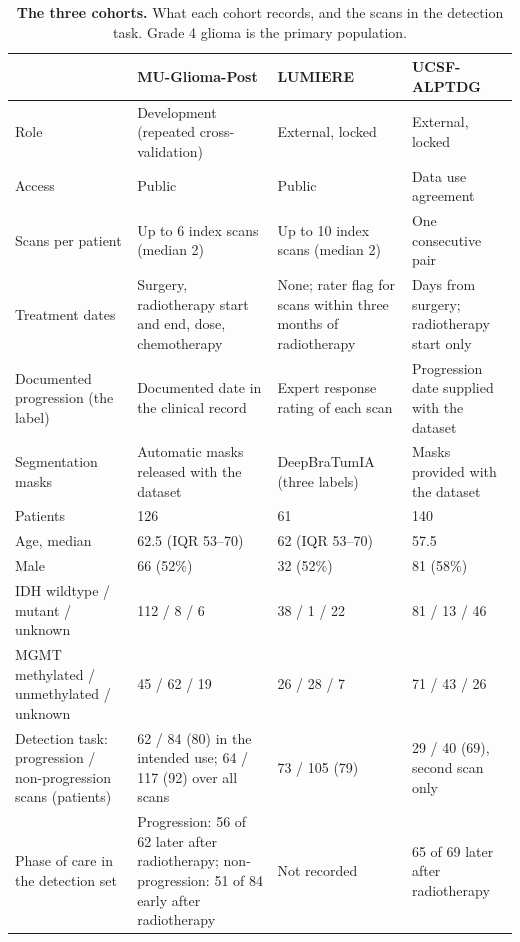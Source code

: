\documentclass[largeformat]{interact} %
\begin{document}
\begin{table}[!htbp]
\centering
\caption[The three cohorts]{\textbf{The three cohorts.} What each cohort records, and the scans in the detection task.
Grade 4 glioma is the primary population.}
\label{tab:1}
\begin{threeparttable}
\begin{tabularx}{\linewidth}{@{}R{3.3cm}LLL@{}}
\toprule
 & MU-Glioma-Post & LUMIERE & UCSF-ALPTDG \\
\midrule
Role & Development (repeated cross-validation) & External, locked & External, locked \\
Access & Public & Public & Data use agreement \\
Scans per patient & Up to 6 index scans (median 2) & Up to 10 index scans (median 2) & One consecutive pair \\
Treatment dates & Surgery, radiotherapy start and end, dose, chemotherapy & None; rater flag for scans within three months of radiotherapy & Days from surgery; radiotherapy start only \\
Documented progression (the label) & Documented date in the clinical record & Expert response rating of each scan & Progression date supplied with the dataset \\
Segmentation masks & Automatic masks released with the dataset & DeepBraTumIA (three labels) & Masks provided with the dataset \\
\addlinespace
Patients & 126 & 61 & 140 \\
Age, median & 62.5 (IQR 53--70) & 62 (IQR 53--70) & 57.5 \\
Male & 66 (52\%) & 32 (52\%) & 81 (58\%) \\
IDH wildtype / mutant / unknown & 112 / 8 / 6 & 38 / 1 / 22 & 81 / 13 / 46 \\
MGMT methylated / unmethylated / unknown & 45 / 62 / 19 & 26 / 28 / 7 & 71 / 43 / 26 \\
\addlinespace
Detection task: progression / non-progression scans (patients) & 62 / 84 (80) in the intended use; 64 / 117 (92) over all scans & 73 / 105 (79) & 29 / 40 (69), second scan only \\
Phase of care in the detection set & Progression: 56 of 62 later after radiotherapy; non-progression: 51 of 84 early after radiotherapy & Not recorded & 65 of 69 later after radiotherapy \\

\end{tabularx}
\end{threeparttable}
\end{table}
\end{document}
